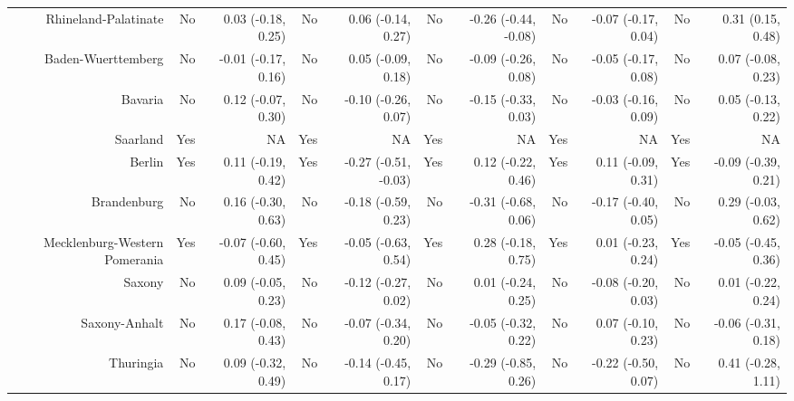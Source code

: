 \documentclass[
  man,floatsintext]{apa6}
\newenvironment{lltable}{\begin{landscape}\centering\begin{ThreePartTable}}{\end{ThreePartTable}\end{landscape}}
\begin{document}
\begin{lltable}
{\begin{longtable}{rrrrrrrrrrr}
Rhineland-Palatinate & No & 0.03 (-0.18, 0.25) & No & 0.06 (-0.14, 0.27) & No & -0.26 (-0.44, -0.08) & No & -0.07 (-0.17, 0.04) & No & 0.31 (0.15, 0.48)\\
Baden-Wuerttemberg & No & -0.01 (-0.17, 0.16) & No & 0.05 (-0.09, 0.18) & No & -0.09 (-0.26, 0.08) & No & -0.05 (-0.17, 0.08) & No & 0.07 (-0.08, 0.23)\\
Bavaria & No & 0.12 (-0.07, 0.30) & No & -0.10 (-0.26, 0.07) & No & -0.15 (-0.33, 0.03) & No & -0.03 (-0.16, 0.09) & No & 0.05 (-0.13, 0.22)\\
Saarland & Yes & NA & Yes & NA & Yes & NA & Yes & NA & Yes & NA\\
Berlin & Yes & 0.11 (-0.19, 0.42) & Yes & -0.27 (-0.51, -0.03) & Yes & 0.12 (-0.22, 0.46) & Yes & 0.11 (-0.09, 0.31) & Yes & -0.09 (-0.39, 0.21)\\
Brandenburg & No & 0.16 (-0.30, 0.63) & No & -0.18 (-0.59, 0.23) & No & -0.31 (-0.68, 0.06) & No & -0.17 (-0.40, 0.05) & No & 0.29 (-0.03, 0.62)\\
Mecklenburg-Western Pomerania & Yes & -0.07 (-0.60, 0.45) & Yes & -0.05 (-0.63, 0.54) & Yes & 0.28 (-0.18, 0.75) & Yes & 0.01 (-0.23, 0.24) & Yes & -0.05 (-0.45, 0.36)\\
Saxony & No & 0.09 (-0.05, 0.23) & No & -0.12 (-0.27, 0.02) & No & 0.01 (-0.24, 0.25) & No & -0.08 (-0.20, 0.03) & No & 0.01 (-0.22, 0.24)\\
Saxony-Anhalt & No & 0.17 (-0.08, 0.43) & No & -0.07 (-0.34, 0.20) & No & -0.05 (-0.32, 0.22) & No & 0.07 (-0.10, 0.23) & No & -0.06 (-0.31, 0.18)\\
Thuringia & No & 0.09 (-0.32, 0.49) & No & -0.14 (-0.45, 0.17) & No & -0.29 (-0.85, 0.26) & No & -0.22 (-0.50, 0.07) & No & 0.41 (-0.28, 1.11)\\
\bottomrule
\end{longtable}

}

\end{lltable}
\end{document}
